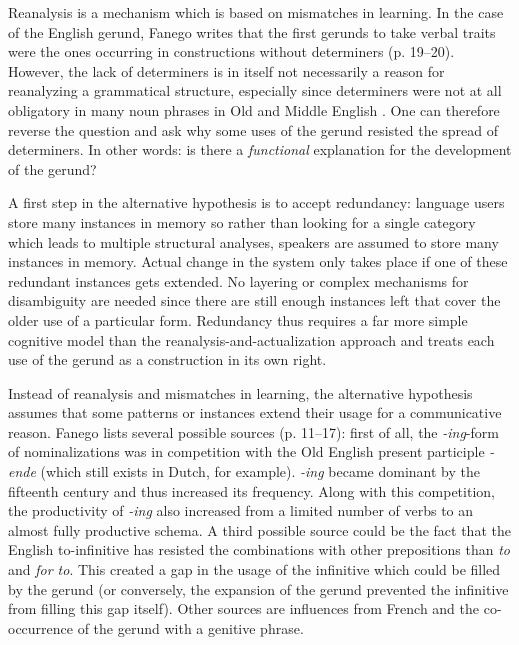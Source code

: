  Reanalysis is a mechanism which is based on mismatches in learning. In the case of the English gerund, Fanego writes that the first gerunds to take verbal traits were the ones occurring in constructions without determiners (p. 19--20). However, the lack of determiners is in itself not necessarily a reason for reanalyzing a grammatical structure, especially since determiners were not at all obligatory in many noun phrases in Old and Middle English \citep[p. 172--174]{traugott92syntax}. One can therefore reverse the question and ask why some uses of the gerund resisted the spread of determiners. In other words: is there a {\em functional} explanation for the development of the gerund?

A first step in the alternative hypothesis is to accept  redundancy: language users store many instances in memory so rather than looking for a single category which leads to multiple structural analyses, speakers are assumed to store many instances in memory. Actual change in the system only takes place if one of these redundant instances gets extended. No layering or complex mechanisms for disambiguity are needed since there are still enough instances left that cover the older use of a particular form. Redundancy thus requires a far more simple cognitive model than the reanalysis-and-actualization approach and treats each use of the gerund as a construction in its own right.

Instead of reanalysis and mismatches in learning, the alternative hypothesis assumes that some patterns or instances extend their usage for a communicative reason. Fanego lists several possible sources (p. 11--17): first of all, the {\em-ing}-form of nominalizations was in competition with the Old English present participle {\em -ende} (which still exists in Dutch, for example). {\em -ing} became dominant by the fifteenth century and thus increased its frequency. Along with this competition, the productivity of {\em -ing} also increased from a limited number of verbs to an almost fully productive schema. A third possible source could be the fact that the English  to-infinitive has resisted the combinations with other prepositions than {\em to} and {\em for to}. This created a gap in the usage of the infinitive which could be filled by the gerund (or conversely, the expansion of the gerund prevented the infinitive from filling this gap itself). Other sources are influences from French and the co-occurrence of the gerund with a genitive phrase.

